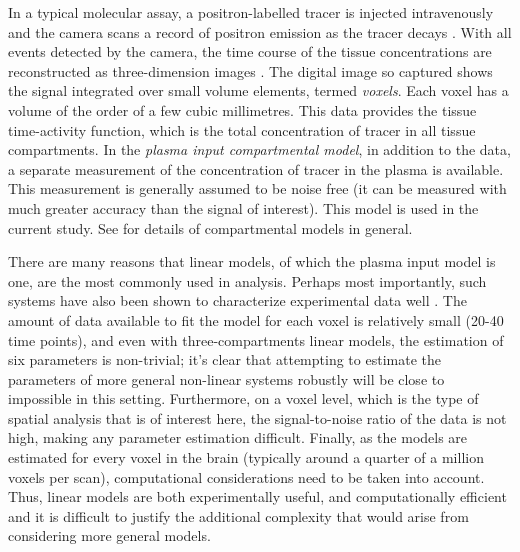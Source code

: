 In a typical molecular assay, a positron-labelled tracer is injected
intravenously and the \pet camera scans a record of positron emission as the
tracer decays \cite{Phelps2000}.  With all events detected by the \pet camera,
the time course of the tissue concentrations are reconstructed as
three-dimension images \cite{Kinahan1989}. The digital image so captured shows
the signal integrated over small volume elements, termed \emph{voxels}. Each
voxel has a volume of the order of a few cubic millimetres. This data provides
the tissue time-activity function, which is the total concentration of tracer
in all tissue compartments. In the \emph{plasma input compartmental model}, in
addition to the \pet data, a separate measurement of the concentration of
tracer in the plasma is available. This measurement is generally assumed to be
noise free (it can be measured with much greater accuracy than the signal of
interest). This model is used in the current study. See \cite{Gunn:2001cx} for
details of \pet compartmental models in general.

There are many reasons that linear \ode models, of which the plasma input
model is one, are the most commonly used in \pet analysis. Perhaps most
importantly, such systems have also been shown to characterize \pet
experimental data well \cite{Lammertsma96}. The amount of data available
to fit the model for each voxel is relatively small (20-40 time points),
and even with three-compartments linear \ode models, the estimation of six
parameters is non-trivial; it's clear that attempting to estimate the
parameters of more general non-linear \ode systems robustly will be close
to impossible in this setting. Furthermore, on a voxel level, which is the
type of spatial analysis that is of interest here, the signal-to-noise
ratio of the data is not high, making any parameter estimation difficult.
Finally, as the models are estimated for every voxel in the brain
(typically around a quarter of a million voxels per scan), computational
considerations need to be taken into account. Thus, linear \ode models are
both experimentally useful, and computationally efficient and it is difficult
to justify the additional complexity that would arise from considering more
general models.

